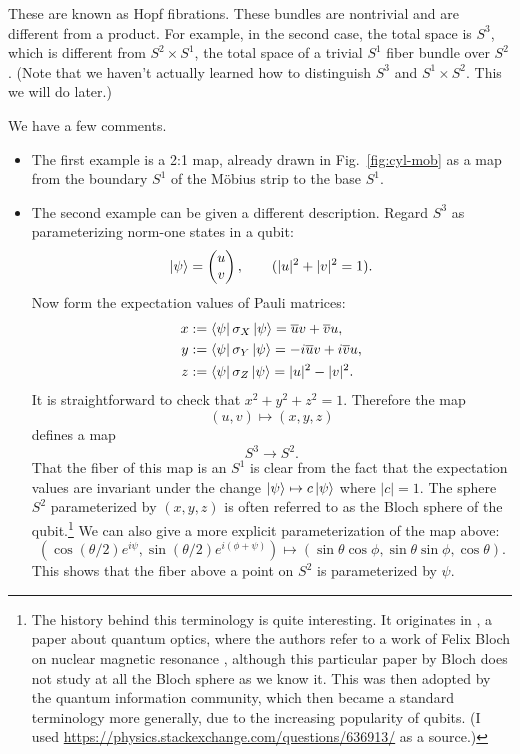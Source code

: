 \documentclass[12pt]{article}
\numberwithin{equation}{section}
\let\bar\overline
\begin{document}
These are known as Hopf fibrations.
These bundles are nontrivial
and are different from a product.
For example, in the second case,
the total space is $S^3$,
which is different from $S^2\times S^1$,
the total space of a trivial $S^1$ fiber bundle over $S^2$.
(Note that we haven't actually learned how to distinguish
$S^3$ and $S^1\times S^2$.
This we will do later.)

We have a few comments.
\begin{itemize}
\item The first example is a 2:1 map,
already drawn in Fig.~\ref{fig:cyl-mob} 
as a map from the boundary $S^1$ of the M\"obius strip to the base $S^1$.
\item The second example can be given a different description. 
Regard $S^3$ as parameterizing norm-one states
in a qubit:
\begin{equation}
  \ket{\psi}=\begin{pmatrix}u \\v \end{pmatrix},
  \qquad (|u|^2+|v|^2=1).
\end{equation}
Now form the expectation values of Pauli matrices:
\begin{align}
  x &:= \bra{\psi} \sigma_X \ket{\psi} = \bar u v + \bar v u, \\
  y &:= \bra{\psi} \sigma_Y \ket{\psi} = -i\bar u v +i \bar v u, \\
  z &:= \bra{\psi} \sigma_Z \ket{\psi} = |u|^2 - |v|^2.
\end{align}
It is straightforward to check that $x^2+y^2+z^2=1$.
Therefore the map \begin{equation}
(u,v)\mapsto (x,y,z)
\label{eq:uvXYZ}
\end{equation} defines a map \begin{equation}
  S^3\to S^2.
\end{equation}
That the fiber of this map is an $S^1$ is clear from the fact
that the expectation values are invariant under the change
$\ket{\psi}\mapsto c\ket{\psi}$ where $|c|=1$.
The sphere $S^2$ parameterized by $(x,y,z)$ is often referred to as the Bloch sphere of the qubit.\footnote{%
The history behind this terminology is quite interesting.
It originates in \cite{ACGT}, a paper about quantum optics,
where the authors refer to a work of Felix Bloch on nuclear magnetic resonance \cite{Bloch}, 
although this particular paper by Bloch does not study at all the Bloch sphere as we know it.
This was then adopted by the quantum information community,
which then became a standard terminology more generally, due to the increasing popularity of qubits. 
(I used \url{https://physics.stackexchange.com/questions/636913/} as a source.)
}
We can also give a more explicit parameterization of the map above:
\begin{equation}
  \label{eq:Hopf-explicit}
(\cos(\theta/2)  e^{i \psi},
\sin(\theta/2) e^{i(\phi+\psi)} )
\mapsto  (\sin\theta\cos\phi,\sin\theta\sin\phi,\cos\theta).
\end{equation}
This shows that the fiber above a point on $S^2$ is parameterized by $\psi$.


\end{itemize}
\end{document}

